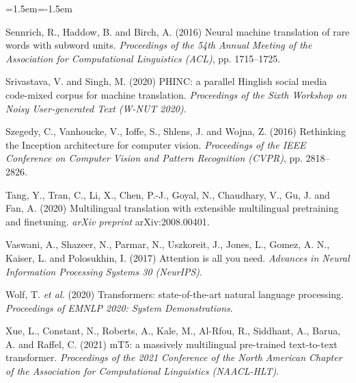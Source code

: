 \documentclass[11pt,a4paper]{article}
\begin{document}
\begin{list}{}{\leftmargin=1.5em\itemindent=-1.5em\itemsep=2pt\parsep=0pt}
\item Sennrich, R., Haddow, B. and Birch, A. (2016) Neural machine translation of rare words with subword units. \textit{Proceedings of the 54th Annual Meeting of the Association for Computational Linguistics (ACL)}, pp. 1715--1725.
\item Srivastava, V. and Singh, M. (2020) PHINC: a parallel Hinglish social media code-mixed corpus for machine translation. \textit{Proceedings of the Sixth Workshop on Noisy User-generated Text (W-NUT 2020)}.
\item Szegedy, C., Vanhoucke, V., Ioffe, S., Shlens, J. and Wojna, Z. (2016) Rethinking the Inception architecture for computer vision. \textit{Proceedings of the IEEE Conference on Computer Vision and Pattern Recognition (CVPR)}, pp. 2818--2826.
\item Tang, Y., Tran, C., Li, X., Chen, P.-J., Goyal, N., Chaudhary, V., Gu, J. and Fan, A. (2020) Multilingual translation with extensible multilingual pretraining and finetuning. \textit{arXiv preprint} arXiv:2008.00401.
\item Vaswani, A., Shazeer, N., Parmar, N., Uszkoreit, J., Jones, L., Gomez, A. N., Kaiser, L. and Polosukhin, I. (2017) Attention is all you need. \textit{Advances in Neural Information Processing Systems 30 (NeurIPS)}.
\item Wolf, T. \textit{et al.} (2020) Transformers: state-of-the-art natural language processing. \textit{Proceedings of EMNLP 2020: System Demonstrations}.
\item Xue, L., Constant, N., Roberts, A., Kale, M., Al-Rfou, R., Siddhant, A., Barua, A. and Raffel, C. (2021) mT5: a massively multilingual pre-trained text-to-text transformer. \textit{Proceedings of the 2021 Conference of the North American Chapter of the Association for Computational Linguistics (NAACL-HLT)}.
\end{list}
\end{document}
